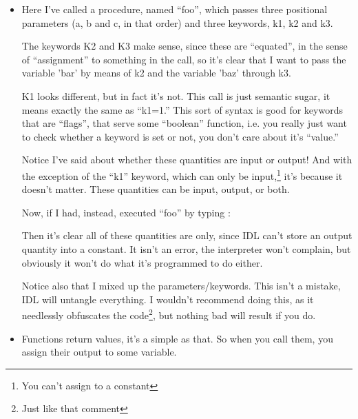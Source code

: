   \begin{itemize}

   \item {}


    Here I've called a procedure, named ``foo'', which passes three positional
    parameters (a, b and c, in that order) and three keywords, k1, k2
    and k3.
  
    The keywords K2 and K3 make sense, since these are ``equated'', in
    the sense of ``assignment'' to something in the call, so it's
    clear that I want to pass the variable 'bar' by means of k2 and
    the variable 'baz' through k3.

    K1 looks different, but in fact it's not. This call is just semantic
    sugar, it means exactly the same as ``k1=1.''  This sort of syntax
    is good for keywords that are ``flags'', that serve some ``boolean''
    function, i.e. you really just want to check whether a keyword is
    set or not, you don't care about it's ``value.''

    Notice I've said  about whether these
   quantities are input or output! And with the exception of the
   ``k1'' keyword, which can only be input,\footnote{You can't assign
   to a constant} it's because it doesn't matter. These quantities can
   be input, output, or both.

     Now, if I had, instead, executed ``foo'' by typing :


    Then it's clear all of these quantities are  only,
    since IDL can't store an output quantity into a constant. It isn't
    an error, the interpreter won't complain, but obviously it won't
    do what it's programmed to do either.

   
    Notice also that I mixed up the parameters/keywords. This isn't a
    mistake, IDL will untangle everything. I wouldn't recommend doing
    this, as it needlessly obfuscates the code\footnote{Just like that
    comment}, but nothing bad will result if you do.

  \item {}
  
   Functions return values, it's a simple as that. So when you call
   them, you assign their output to some variable.


\end{itemize}
